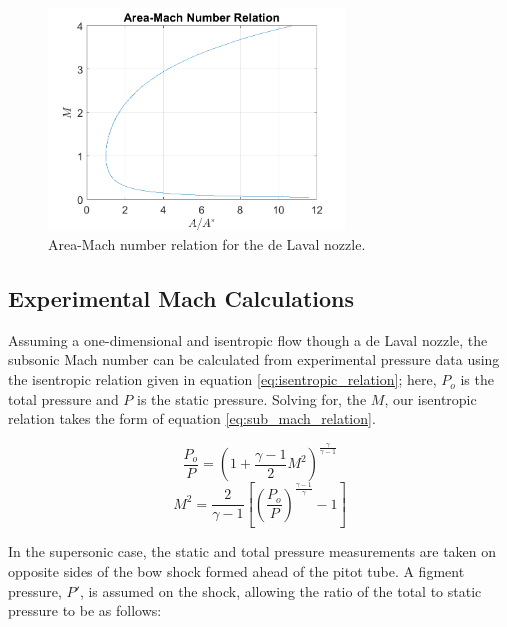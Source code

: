 \documentclass[runningheads]{llncs}
\begin{document}
\begin{figure}
    \centering
    \includegraphics[width=0.7\textwidth]{figures/area_mach_relation.png}
    \caption{Area-Mach number relation for the de Laval nozzle.}
    \label{fig:AM_relation}
\end{figure}

\subsection{Experimental Mach Calculations}

Assuming a one-dimensional and isentropic flow though a de Laval nozzle, the subsonic Mach number can be calculated from experimental pressure data using the isentropic relation given in equation \ref{eq:isentropic_relation}; here, $P_o$ is the total pressure and $P$ is the static pressure. Solving for, the $M$, our isentropic relation takes the form of equation \ref{eq:sub_mach_relation}.

\begin{multicols}{2}
\begin{equation}
    \frac{P_o}{P} = \left(1 + \frac{\gamma - 1}{2}M^2\right)^\frac{\gamma}{\gamma - 1}
    \label{eq:isentropic_relation}
\end{equation}
\begin{equation}
    M^2 = \frac{2}{\gamma - 1}\left[\left(\frac{P_o}{P}\right)^\frac{\gamma - 1}{\gamma} - 1\right]
    \label{eq:sub_mach_relation}
\end{equation}
\end{multicols}

\noindent
In the supersonic case, the static and total pressure measurements are taken on opposite sides of the bow shock formed ahead of the pitot tube. A figment pressure, $P'$, is assumed on the shock, allowing the ratio of the total to static pressure to be as follows:
\end{document}
